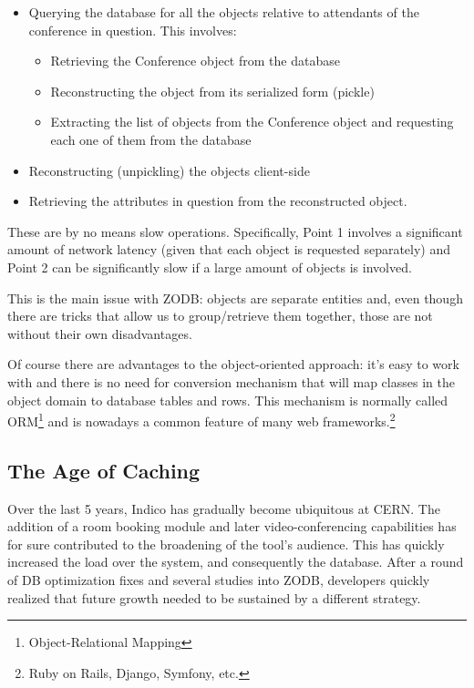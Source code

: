 \begin{itemize}
  \item Querying the database for all the objects relative to attendants of the conference in question. This involves:

  \begin{itemize}
    \item Retrieving the Conference object from the database
    \item Reconstructing the object from its serialized form (pickle)
    \item Extracting the list of objects from the Conference object and requesting each one of them from the database
  \end{itemize}
  \item Reconstructing (unpickling) the objects client-side
  \item Retrieving the attributes in question from the reconstructed object.
\end{itemize}

These are by no means slow operations. Specifically, Point 1 involves a significant amount of network latency (given that each object is requested separately) and Point 2 can be significantly slow if a large amount of objects is involved.

This is the main issue with \textsc{ZODB}: objects are separate entities and, even though there are tricks that allow us to group/retrieve them together, those are not without their own disadvantages.

Of course there are advantages to the object-oriented approach: it's easy to work with and there is no need for conversion mechanism that will map classes in the object domain to database tables and rows. This mechanism is normally called \textsc{ORM}\footnote{Object-Relational Mapping} and is nowadays a common feature of many web frameworks.\footnote{Ruby on Rails, Django, Symfony, etc.}

\subsection{The Age of Caching}

Over the last 5 years, Indico has gradually become ubiquitous at \textsc{CERN}. The addition of a room booking module and later video-conferencing capabilities has for sure contributed to the broadening of the tool's audience. This has quickly increased the load over the system, and consequently the database. After a round of DB optimization fixes and several studies into \textsc{ZODB}, developers quickly realized that future growth needed to be sustained by a different strategy.

